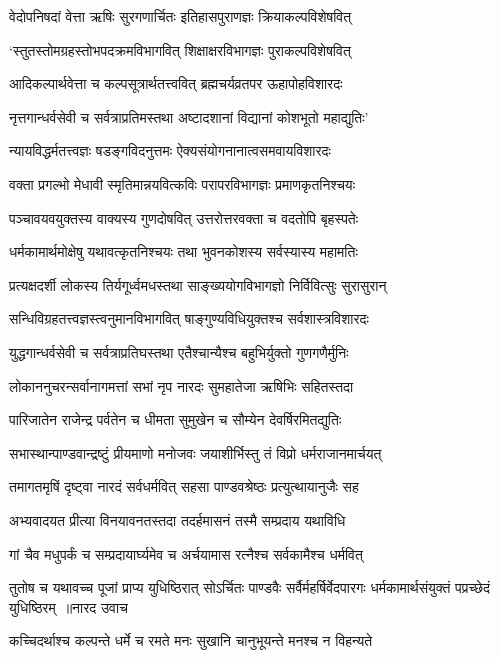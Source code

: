 \twolineshloka
{वेदोपनिषदां वेत्ता ऋषिः सुरगणार्चितः}
{इतिहासपुराणज्ञः क्रियाकल्पविशेषवित्}


\twolineshloka
{`स्तुतस्तोमग्रहस्तोभपदक्रमविभागवित्}
{शिक्षाक्षरविभागज्ञः पुराकल्पविशेषवित्}


\twolineshloka
{आदिकल्पार्थवेत्ता च कल्पसूत्रार्थतत्त्ववित्}
{ब्रह्मचर्यव्रतपर ऊहापोहविशारदः}


\twolineshloka
{नृत्तगान्धर्वसेवी च सर्वत्राप्रतिमस्तथा}
{अष्टादशानां विद्यानां कोशभूतो महाद्युतिः'}


\twolineshloka
{न्यायविद्धर्मतत्त्वज्ञः षडङ्गविदनुत्तमः}
{ऐक्यसंयोगनानात्वसमवायविशारदः}


\twolineshloka
{वक्ता प्रगल्भो मेधावी स्मृतिमान्नयवित्कविः}
{परापरविभागज्ञः प्रमाणकृतनिश्चयः}


\twolineshloka
{पञ्चावयवयुक्तस्य वाक्यस्य गुणदोषवित्}
{उत्तरोत्तरवक्ता च वदतोपि बृहस्पतेः}


\twolineshloka
{धर्मकामार्थमोक्षेषु यथावत्कृतनिश्चयः}
{तथा भुवनकोशस्य सर्वस्यास्य महामतिः}


\twolineshloka
{प्रत्यक्षदर्शी लोकस्य तिर्यगूर्ध्वमधस्तथा}
{साङ्ख्ययोगविभागज्ञो निर्विवित्सुः सुरासुरान्}


\twolineshloka
{सन्धिविग्रहतत्त्वज्ञस्त्वनुमानविभागवित्}
{षाङ्गुण्यविधियुक्तश्च सर्वशास्त्रविशारदः}


\twolineshloka
{युद्धगान्धर्वसेवी च सर्वत्राप्रतिघस्तथा}
{एतैश्चान्यैश्च बहुभिर्युक्तो गुणगणैर्मुनिः}


\twolineshloka
{लोकाननुचरन्सर्वानागमत्तां सभां नृप}
{नारदः सुमहातेजा ऋषिभिः सहितस्तदा}


\twolineshloka
{पारिजातेन राजेन्द्र पर्वतेन च धीमता}
{सुमुखेन च सौम्येन देवर्षिरमितद्युतिः}


\twolineshloka
{सभास्थान्पाण्डवान्द्रष्टुं प्रीयमाणो मनोजवः}
{जयाशीर्भिस्तु तं विप्रो धर्मराजानमार्चयत्}


\twolineshloka
{तमागतमृषिं दृष्ट्वा नारदं सर्वधर्मवित्}
{सहसा पाण्डवश्रेष्ठः प्रत्युत्थायानुजैः सह}


\twolineshloka
{अभ्यवादयत प्रीत्या विनयावनतस्तदा}
{तदर्हमासनं तस्मै सम्प्रदाय यथाविधि}


\twolineshloka
{गां चैव मधुपर्कं च सम्प्रदायार्घ्यमेव च}
{अर्चयामास रत्नैश्च सर्वकामैश्च धर्मवित्}


\fourlineindentedshloka
{तुतोष च यथावच्च पूजां प्राप्य युधिष्ठिरात्}
{सोऽर्चितः पाण्डवैः सर्वैर्महर्षिर्वेदपारगः}
{धर्मकामार्थसंयुक्तं पप्रच्छेदं युधिष्ठिरम् ॥नारद उवाच}
{}


\twolineshloka
{कच्चिदर्थाश्च कल्पन्ते धर्मे च रमते मनः}
{सुखानि चानुभूयन्ते मनश्च न विहन्यते}


